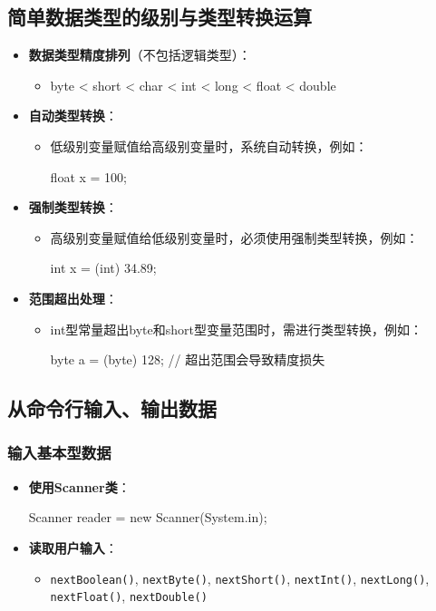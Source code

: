 \documentclass[a4paper, 10pt]{ctexart}
\begin{document}
\subsection{简单数据类型的级别与类型转换运算}
\begin{itemize}
  \item \textbf{数据类型精度排列}（不包括逻辑类型）：
  \begin{itemize}
    \item byte < short < char < int < long < float < double
  \end{itemize}
  \item \textbf{自动类型转换}：
  \begin{itemize}
    \item 低级别变量赋值给高级别变量时，系统自动转换，例如：
    \begin{codeblock}
float x = 100;
    \end{codeblock}
  \end{itemize}
  \item \textbf{强制类型转换}：
  \begin{itemize}
    \item 高级别变量赋值给低级别变量时，必须使用强制类型转换，例如：
    \begin{codeblock}
int x = (int) 34.89;
    \end{codeblock}
  \end{itemize}
  \item \textbf{范围超出处理}：
  \begin{itemize}
    \item int型常量超出byte和short型变量范围时，需进行类型转换，例如：
    \begin{codeblock}
byte a = (byte) 128;  // 超出范围会导致精度损失
    \end{codeblock}
  \end{itemize}
\end{itemize}

\subsection{从命令行输入、输出数据}
\subsubsection{输入基本型数据}
\begin{itemize}
  \item \textbf{使用Scanner类}：
  \begin{codeblock}
Scanner reader = new Scanner(System.in);
  \end{codeblock}
  \item \textbf{读取用户输入}：
  \begin{itemize}
    \item \texttt{nextBoolean()}, \texttt{nextByte()}, \texttt{nextShort()}, \texttt{nextInt()}, \texttt{nextLong()}, \texttt{nextFloat()}, \texttt{nextDouble()}
  \end{itemize}
\end{itemize}
\end{document}
